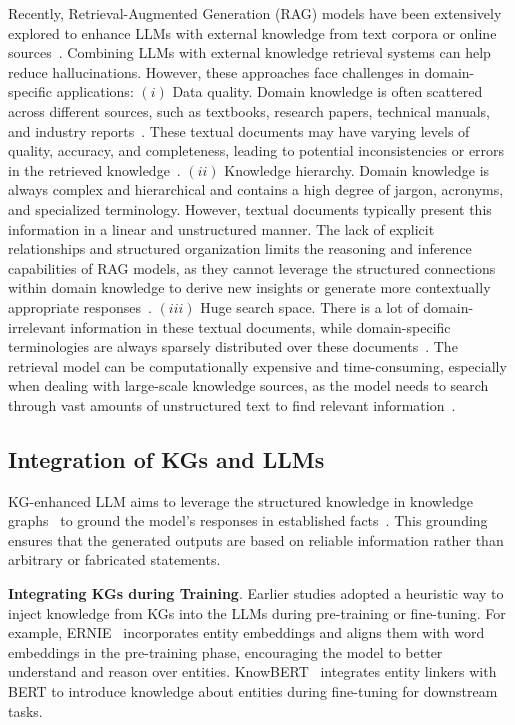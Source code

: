\documentclass{article}
\theoremstyle{boldremark}
\begin{document}
Recently, Retrieval-Augmented Generation (RAG) models have been extensively explored to enhance LLMs with external knowledge from text corpora or online sources~\cite{lewis2020retrieval,zhao2023survey,minaee2024large}. Combining LLMs with external knowledge retrieval systems can help reduce hallucinations. However, these approaches face challenges in domain-specific applications: $(i)$  Data quality. Domain knowledge is often scattered across different sources, such as textbooks, research papers, technical manuals, and industry reports~\cite{li2022survey}. These textual documents may have varying levels of quality, accuracy, and completeness, leading to potential inconsistencies or errors in the retrieved knowledge~\cite{zhu2021retrieving}.
$(ii)$ Knowledge hierarchy.
Domain knowledge is always complex and hierarchical and contains a high degree of jargon, acronyms, and specialized terminology. However, textual documents typically present this information in a linear and unstructured manner.
The lack of explicit relationships and structured organization limits the reasoning and inference capabilities of RAG models, as they cannot leverage the structured connections within domain knowledge to derive new insights or generate more contextually appropriate responses~\cite{santoro2016meta}.
 $(iii)$ Huge search space.  There is a lot of domain-irrelevant information in these textual documents, while domain-specific terminologies are always sparsely distributed over these documents~\cite{siriwardhana2023improving}. The retrieval model can be computationally expensive and time-consuming, especially when dealing with large-scale knowledge sources, as the model needs to search through vast amounts of unstructured text to find relevant information~\cite{metzler2021rethinking}.
 
\subsection{Integration of KGs and LLMs}
KG-enhanced LLM aims to leverage the structured knowledge in knowledge graphs~\cite{li2022kcube,li2022constructing,shengyuan2024differentiable,zhang2022contrastive,zhang2023integrating} to ground the model's responses in established facts~\cite{hu2023survey,yang2024give,pan2024unifying}. 
This grounding ensures that the generated outputs are based on reliable information rather than arbitrary or fabricated statements. 

{\bf Integrating KGs during Training}. 
Earlier studies adopted a heuristic way to inject knowledge from KGs into the LLMs during pre-training or fine-tuning. For example, ERNIE~\cite{sun2021ernie} incorporates entity embeddings and aligns them with word embeddings in the pre-training phase, encouraging the model to better understand and reason over entities. KnowBERT~\cite{peters2019knowledge} integrates entity linkers with BERT to introduce knowledge about entities during fine-tuning for downstream tasks. 
\end{document}
